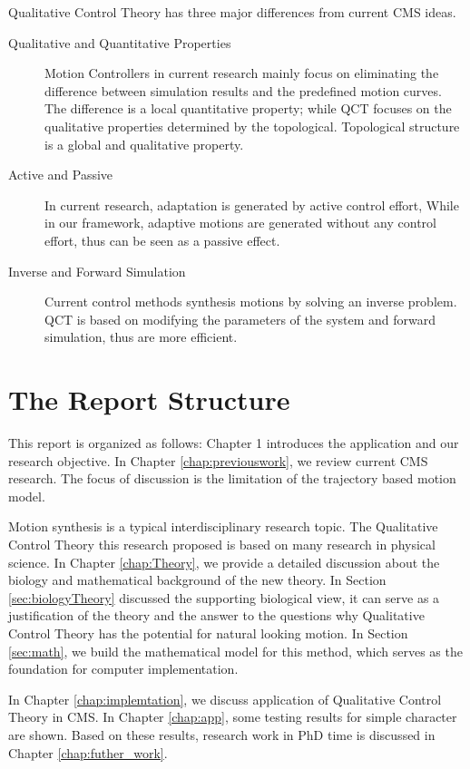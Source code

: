 Qualitative Control Theory has three major differences from current CMS ideas.  
\begin{description}
\item [Qualitative and Quantitative Properties]
Motion Controllers in current research mainly focus on eliminating the difference between simulation results and the predefined motion curves. 
The difference is a local quantitative property;
while QCT  focuses on the qualitative properties determined by the topological.
Topological structure is a global and qualitative property.


\item [Active and Passive]
In current research, adaptation is generated by active control effort, 
While in our framework, adaptive motions are generated without any control effort, 
thus can be seen as a passive effect.
\item [Inverse and Forward Simulation]
Current control methods synthesis motions by solving an inverse problem. 
QCT is based on modifying the parameters of the system and forward simulation, thus are more efficient.
\end{description}

\section{The Report Structure}

This report is organized as follows:
Chapter 1 introduces the application and our research objective.
In Chapter \ref{chap:previouswork}, we review current CMS research.
The focus of discussion is the limitation of the trajectory based motion model.


Motion synthesis is a typical interdisciplinary research topic.
The Qualitative Control Theory this research proposed is based on many research in physical science.
In Chapter \ref{chap:Theory}, we provide a detailed discussion about the biology and mathematical background of the new theory.
In Section \ref{sec:biologyTheory} discussed the supporting biological view, 
it can serve as a justification of the theory and the answer to the questions why Qualitative Control Theory has the potential for natural looking motion.
In Section \ref{sec:math}, we build the mathematical model for this method, which serves as the foundation for computer implementation.
 
In Chapter \ref{chap:implemtation}, we discuss application of Qualitative Control Theory in CMS.
In Chapter \ref{chap:app}, some testing results for simple character are shown.
Based on these results, research work in PhD time is discussed in Chapter \ref{chap:futher_work}.
 






